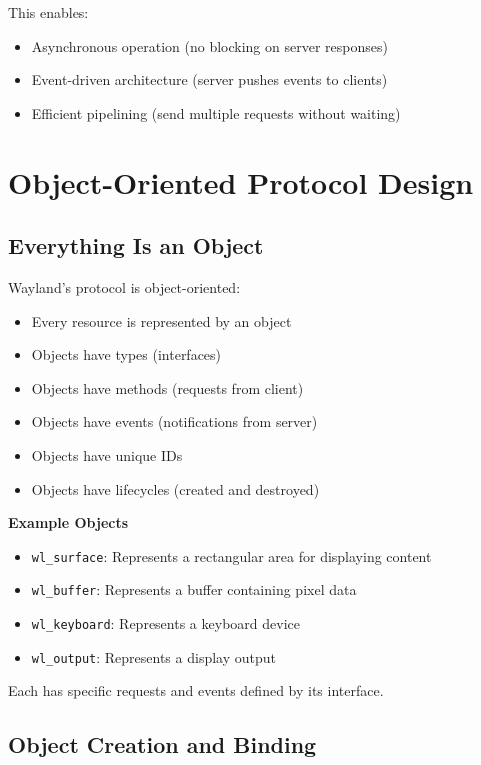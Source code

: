 This enables:
\begin{itemize}
    \item Asynchronous operation (no blocking on server responses)
    \item Event-driven architecture (server pushes events to clients)
    \item Efficient pipelining (send multiple requests without waiting)
\end{itemize}

\section{Object-Oriented Protocol Design}

\subsection{Everything Is an Object}

Wayland's protocol is object-oriented:
\begin{itemize}
    \item Every resource is represented by an object
    \item Objects have types (interfaces)
    \item Objects have methods (requests from client)
    \item Objects have events (notifications from server)
    \item Objects have unique IDs
    \item Objects have lifecycles (created and destroyed)
\end{itemize}

\begin{examplebox}
\textbf{Example Objects}

\begin{itemize}
    \item \texttt{wl\_surface}: Represents a rectangular area for displaying content
    \item \texttt{wl\_buffer}: Represents a buffer containing pixel data
    \item \texttt{wl\_keyboard}: Represents a keyboard device
    \item \texttt{wl\_output}: Represents a display output
\end{itemize}

Each has specific requests and events defined by its interface.
\end{examplebox}

\subsection{Object Creation and Binding}

